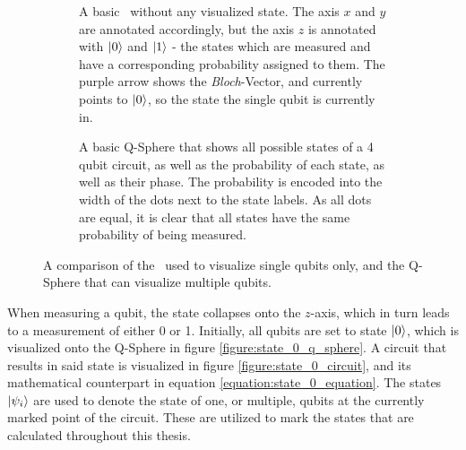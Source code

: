 \begin{figure}[!h]
    \centering
    \begin{subfigure}{.4\textwidth}
        \centering
        \scalebox{\blochwidth}{
            
        }
        \caption{A basic \bloch\ without any visualized state. The axis $x$ and $y$ are annotated accordingly, but the axis $z$ is annotated with $\ket{0}$ and $\ket{1}$ - the states which are measured and have a corresponding probability assigned to them. The purple arrow shows the \emph{Bloch}-Vector, and currently points to $\ket{0}$, so the state the single qubit is currently in.}
        \label{figure:basic_bloch_sphere}
    \end{subfigure}
    \begin{subfigure}{.4\textwidth}
        \centering
        \scalebox{\qspherewidth}{
            
        }
        \caption{A basic Q-Sphere that shows all possible states of a 4 qubit circuit, as well as the probability of each state, as well as their phase. The probability is encoded into the width of the dots next to the state labels. As all dots are equal, it is clear that all states have the same probability of being measured.}
        \label{figure:q_sphere_4qubit_h}
    \end{subfigure}
    \caption{A comparison of the \bloch\ used to visualize single qubits only, and the Q-Sphere that can visualize multiple qubits.}
    \label{fig:comparison_bloch_sphere_q_sphere}
\end{figure}

When measuring a qubit, the state collapses onto the $z$-axis\cite{feynman_feynman_1965}, which in turn leads to a measurement of either 0 or 1. Initially, all qubits are set to state $\ket{0}$, which is visualized onto the Q-Sphere in figure \ref{figure:state_0_q_sphere}. A circuit that results in said state is visualized in figure \ref{figure:state_0_circuit}, and its mathematical counterpart in equation \ref{equation:state_0_equation}. The states $\ket{\psi_i}$ are used to denote the state of one, or multiple, qubits at the currently marked point of the circuit. These are utilized to mark the states that are calculated throughout this thesis.

